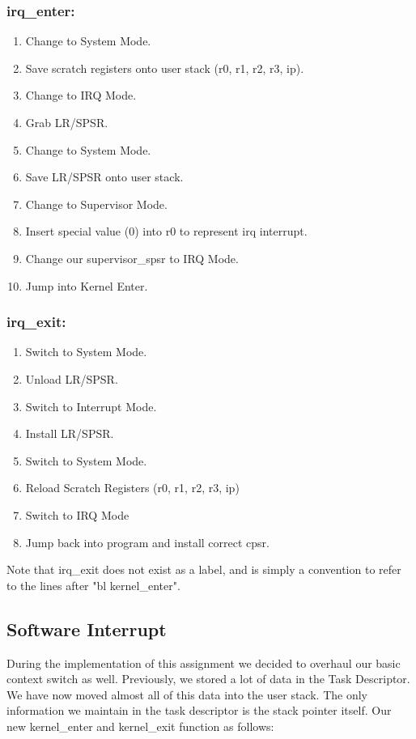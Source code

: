 \documentclass{article}
\begin{document}
\subsubsection{irq\_enter:}
\begin{enumerate}
    \item Change to System Mode.
    \item Save scratch registers onto user stack (r0, r1, r2, r3, ip).
    \item Change to IRQ Mode.
    \item Grab LR/SPSR.
    \item Change to System Mode. 
    \item Save LR/SPSR onto user stack.
    \item Change to Supervisor Mode.
    \item Insert special value (0) into r0 to represent irq interrupt.
    \item Change our supervisor\_spsr to IRQ Mode.
    \item Jump into Kernel Enter.
\end{enumerate}

\subsubsection{irq\_exit:}
\begin{enumerate}
    \item Switch to System Mode.
    \item Unload LR/SPSR.
    \item Switch to Interrupt Mode.
    \item Install LR/SPSR.
    \item Switch to System Mode.
    \item Reload Scratch Registers (r0, r1, r2, r3, ip)
    \item Switch to IRQ Mode
    \item Jump back into program and install correct cpsr.
\end{enumerate}

Note that irq\_exit does not exist as a label, and is simply a convention to refer to the lines after "bl kernel\_enter".

\subsection{Software Interrupt}

During the implementation of this assignment we decided to overhaul our basic context switch as well. Previously, we stored a lot of data in the Task Descriptor. We have now moved almost all of this data into the user stack. The only information we maintain in the task descriptor is the stack pointer itself. Our new kernel\_enter and kernel\_exit function as follows:
\end{document}
